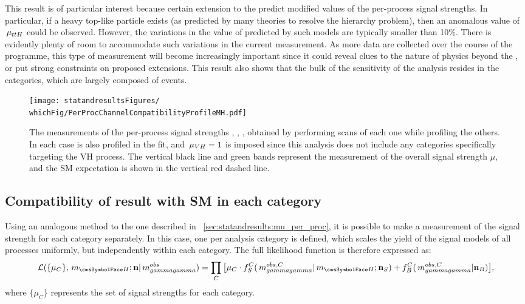 This result is of particular interest because certain extension to the \SM predict modified values of the per-process signal strengths. In particular, if a heavy top-like particle exists (as predicted by many theories to resolve the hierarchy problem), then an anomalous value of $\,\mu_{ttH}$ could be observed. However, the variations in the value of \muttH predicted by such models are typically smaller than 10\%. There is evidently plenty of room to accommodate such variations in the current measurement. As more data are collected over the course of the \LHC programme, this type of measurement will become increasingly important since it could reveal clues to the nature of physics beyond the \SM, or put strong constraints on proposed extensions. This result also shows that the bulk of the sensitivity of the analysis resides in the \Untagged categories, which are largely composed of \ggH events.

\begin{figure}[h!]
\centering
\texttt{[image: statandresultsFigures/\\whichFig/PerProcChannelCompatibilityProfileMH.pdf]} 
\caption{The measurements of the per-process signal strengths \muggH, \muVBF, \muttH, obtained by performing \DNLL scans of each one while profiling the others. In each case \mH is also profiled in the fit, and $\,\mu_{VH}=1$ is imposed since this analysis does not include any categories specifically targeting the VH process. The vertical black line and green bands represent the measurement of the overall signal strength $\mu$, and the SM expectation is shown in the vertical red dashed line.}

\label{fig:statandresults:mu_per_proc}

\end{figure}

\subsection{Compatibility of result with SM in each category}

Using an analogous method to the one described in \Sec~\ref{sec:statandresults:mu_per_proc}, it is possible to make a measurement of the signal strength for each category separately. In this case, one \POI per analysis category is defined, which scales the yield of the signal models of all processes uniformly, but independently within each category. The full likelihood function is therefore expressed as:
\begin{equation}
\label{eq:statandresults:likelihood_function}
\mathcal{L}(\{\mu_C\}, \mH; \mathbf{n} | \mgg^{obs} ) = \prod_C \big[\mu_C \cdot f^C_S(\mgg^{obs,C} |\mH ; \mathbf{n}_S) + f^C_B(\mgg^{obs,C} | \mathbf{n}_B )\big], 
\end{equation}
where $\{\mu_C\}$ represents the set of signal strengths for each category.

